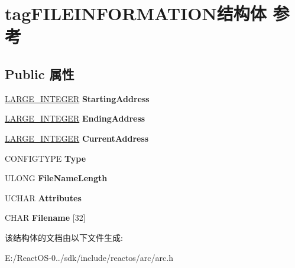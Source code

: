 \hypertarget{structtag_f_i_l_e_i_n_f_o_r_m_a_t_i_o_n}{}\section{tag\+F\+I\+L\+E\+I\+N\+F\+O\+R\+M\+A\+T\+I\+O\+N结构体 参考}
\label{structtag_f_i_l_e_i_n_f_o_r_m_a_t_i_o_n}
\subsection*{Public 属性}
\begin{DoxyCompactItemize}
\item 
\mbox{\label{structtag_f_i_l_e_i_n_f_o_r_m_a_t_i_o_n_a8461f6f49780585c4cf89f475ee3c5c6}} 
\hyperlink{union___l_a_r_g_e___i_n_t_e_g_e_r}{L\+A\+R\+G\+E\+\_\+\+I\+N\+T\+E\+G\+ER} {\bfseries Starting\+Address}
\item 
\mbox{\label{structtag_f_i_l_e_i_n_f_o_r_m_a_t_i_o_n_a0a3f027b04a5bdf35084589d0abb7d13}} 
\hyperlink{union___l_a_r_g_e___i_n_t_e_g_e_r}{L\+A\+R\+G\+E\+\_\+\+I\+N\+T\+E\+G\+ER} {\bfseries Ending\+Address}
\item 
\mbox{\label{structtag_f_i_l_e_i_n_f_o_r_m_a_t_i_o_n_a48d5ad58e37322ffa4a3c6c28b1fbd99}} 
\hyperlink{union___l_a_r_g_e___i_n_t_e_g_e_r}{L\+A\+R\+G\+E\+\_\+\+I\+N\+T\+E\+G\+ER} {\bfseries Current\+Address}
\item 
\mbox{\label{structtag_f_i_l_e_i_n_f_o_r_m_a_t_i_o_n_aab70025e3f1266a547050ba368d3351e}} 
C\+O\+N\+F\+I\+G\+T\+Y\+PE {\bfseries Type}
\item 
\mbox{\label{structtag_f_i_l_e_i_n_f_o_r_m_a_t_i_o_n_a3cf264200b73bdf9d88e8c143420cd40}} 
U\+L\+O\+NG {\bfseries File\+Name\+Length}
\item 
\mbox{\label{structtag_f_i_l_e_i_n_f_o_r_m_a_t_i_o_n_a85764be79417615bc94d99a48e063fd1}} 
U\+C\+H\+AR {\bfseries Attributes}
\item 
\mbox{\label{structtag_f_i_l_e_i_n_f_o_r_m_a_t_i_o_n_aeb3075c31ee280905a7aa8b9cecdc950}} 
C\+H\+AR {\bfseries Filename} \mbox{[}32\mbox{]}
\end{DoxyCompactItemize}


该结构体的文档由以下文件生成\+:\begin{DoxyCompactItemize}
\item 
E\+:/\+React\+O\+S-\/0../sdk/include/reactos/arc/arc.\+h\end{DoxyCompactItemize}
